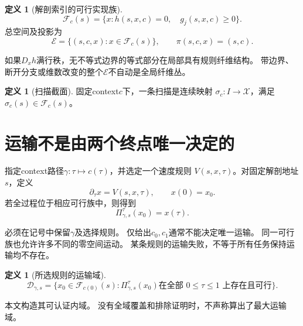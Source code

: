 \documentclass[UTF8,11pt,a4paper,fontset=fandol]{ctexart}
\numberwithin{equation}{section}
\theoremstyle{definition}
\newtheorem{definition}[theorem]{定义}
\begin{document}
\begin{definition}[解剖索引的可行实现族]
\begin{equation}
 \boxed{
 \mathcal F_c(s)=
 \{x:h(s,x,c)=0,\quad g_j(s,x,c)\geq0\}.
 }
 \label{eq:family}
\end{equation}
总空间及投影为
\begin{equation}
 \mathcal E=\{(s,c,x):x\in\mathcal F_c(s)\},
 \qquad
 \pi(s,c,x)=(s,c).
\end{equation}
\end{definition}

如果$D_xh$满行秩，无不等式边界的等式部分在局部具有规则纤维结构。
带边界、断开分支或维数改变的整个$\mathcal E$不自动是全局纤维丛。

\begin{definition}[扫描截面]
固定context$c$下，一条扫描是连续映射
$\sigma_c:I\to\mathcal X$，满足$\sigma_c(s)\in\mathcal F_c(s)$。
\end{definition}

\section{运输不是由两个终点唯一决定的}

指定context路径$\gamma:\tau\mapsto c(\tau)$，并选定一个速度规则
$V(s,x,\tau)$。对固定解剖地址$s$，定义
\begin{equation}
 \partial_\tau x=V(s,x,\tau),\qquad x(0)=x_0.
 \label{eq:flow}
\end{equation}
若全过程位于相应可行族中，则得到
\begin{equation}
 \boxed{
 \Pi_{\gamma,s}^{\tau}(x_0)=x(\tau).
 }
 \label{eq:transport}
\end{equation}

必须在记号中保留$\gamma$及选择规则。
仅给出$c_0,c_1$通常不能决定唯一运输。
同一可行族也允许许多不同的零空间运动。
某条规则的运输失败，不等于所有任务保持运输均不存在。

\begin{definition}[所选规则的运输域]
\begin{equation}
 \mathcal D_{\gamma,s}
 =
 \{x_0\in\mathcal F_{c(0)}(s):
 \Pi_{\gamma,s}^{\tau}(x_0)
 \text{在全部 }0\leq\tau\leq1\text{ 上存在且可行}\}.
\end{equation}
\end{definition}

本文构造其可认证内域。
没有全域覆盖和排除证明时，不声称算出了最大运输域。
\end{document}
